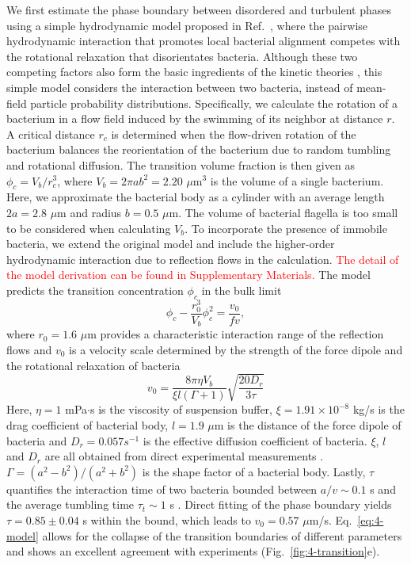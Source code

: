 We first estimate the phase boundary between disordered and turbulent phases using a simple hydrodynamic model proposed in Ref.~\cite{Drescher2011}, where the pairwise hydrodynamic interaction that promotes local bacterial alignment competes with the rotational relaxation that disorientates bacteria. Although these
two competing factors also form the basic ingredients of the kinetic theories \cite{Koch2011, Saintillan2015}, this simple model considers the interaction between two bacteria, instead of mean-field particle probability distributions. Specifically, we calculate the rotation of a bacterium in a flow field induced by the swimming of its neighbor at distance $r$. A critical distance $r_c$ is determined when the flow-driven rotation of the bacterium balances the reorientation of the bacterium due to random tumbling and rotational diffusion. The transition volume fraction is then given as $\phi_c=V_b/r_c^3$, where $V_b = 2\pi ab^2 = 2.20$ $\mu$m$^3$ is the volume of a single bacterium. Here, we approximate the bacterial body as a cylinder with an average length $2a = 2.8$ $\mu$m and
radius $b = 0.5$ $\mu$m. The volume of bacterial flagella is too small to be considered when calculating $V_b$. To incorporate the presence of immobile bacteria, we extend the original model and include the higher-order hydrodynamic interaction due to reflection flows in the calculation. \textcolor{red}{The detail of the model derivation can be found in Supplementary Materials.} The model predicts the transition concentration $\phi_c$ in the bulk limit
\begin{equation}
  \label{eq:4-model}
  \phi_c-\frac{r_0^3}{V_b}\phi_c^2 = \frac{v_0}{fv},
\end{equation}
where $r_0 = 1.6$ $\mu$m provides a characteristic interaction range of the reflection flows and $v_0$ is a velocity scale determined by the strength of the force dipole and the rotational relaxation of bacteria
$$
v_0 = \frac{8\pi\eta V_b}{\xi l (\Gamma+1)}\sqrt{\frac{20D_r}{3\tau}}
$$
Here, $\eta = 1$ mPa$\cdot$s is the viscosity of suspension buffer, $\xi = 1.91 \times 10^{-8}$ kg/s is the drag coefficient of bacterial body, $l = 1.9$ $\mu$m is the distance of the force dipole of bacteria and $D_r = 0.057 s^{-1}$ is the effective diffusion coefficient of bacteria. $\xi$, $l$ and $D_r$ are all obtained from direct experimental measurements \cite{Drescher2011}.
$\Gamma = (a^2-b^2)/(a^2+b^2)$ is the shape factor of a bacterial body.
Lastly, $\tau$ quantifies the interaction time of two bacteria bounded between $a/v \sim 0.1$ s and the average tumbling time $\tau_t \sim 1$ s \cite{Berg2004}. Direct fitting of the phase boundary yields $\tau = 0.85 \pm 0.04$ s within the bound, which leads to $v_0 = 0.57$ $\mu$m/s. Eq.~\ref{eq:4-model} allows for the collapse of the transition boundaries of different parameters and shows an excellent agreement with experiments (Fig.~\ref{fig:4-transition}e).
